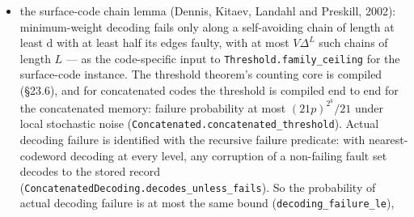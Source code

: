 \documentclass[
]{article}
\providecommand{\tightlist}{%
  \setlength{\itemsep}{0pt}\setlength{\parskip}{0pt}}
\begin{document}
\begin{itemize}
\tightlist
\item
  the surface-code chain lemma (Dennis, Kitaev, Landahl and Preskill,
  2002): minimum-weight decoding fails only along a self-avoiding chain
  of length at least d with at least half its edges faulty, with at most
  \(V\Delta^L\) such chains of length \(L\) --- as the code-specific
  input to
  \texttt{T\allowbreak{}h\allowbreak{}r\allowbreak{}e\allowbreak{}s\allowbreak{}h\allowbreak{}o\allowbreak{}l\allowbreak{}d\allowbreak{}.\allowbreak{}f\allowbreak{}a\allowbreak{}m\allowbreak{}i\allowbreak{}l\allowbreak{}y\allowbreak{}\_\allowbreak{}c\allowbreak{}e\allowbreak{}i\allowbreak{}l\allowbreak{}i\allowbreak{}n\allowbreak{}g}
  for the surface-code instance. The threshold theorem's counting core
  is compiled (§23.6), and for concatenated codes the threshold is
  compiled end to end for the concatenated memory: failure probability
  at most \((21p)^{2^k}/21\) under local stochastic noise
  (\texttt{C\allowbreak{}o\allowbreak{}n\allowbreak{}c\allowbreak{}a\allowbreak{}t\allowbreak{}e\allowbreak{}n\allowbreak{}a\allowbreak{}t\allowbreak{}e\allowbreak{}d\allowbreak{}.\allowbreak{}c\allowbreak{}o\allowbreak{}n\allowbreak{}c\allowbreak{}a\allowbreak{}t\allowbreak{}e\allowbreak{}n\allowbreak{}a\allowbreak{}t\allowbreak{}e\allowbreak{}d\allowbreak{}\_\allowbreak{}t\allowbreak{}h\allowbreak{}r\allowbreak{}e\allowbreak{}s\allowbreak{}h\allowbreak{}o\allowbreak{}l\allowbreak{}d}).
  Actual decoding failure is identified with the recursive failure
  predicate: with nearest-codeword decoding at every level, any
  corruption of a non-failing fault set decodes to the stored record
  (\texttt{C\allowbreak{}o\allowbreak{}n\allowbreak{}c\allowbreak{}a\allowbreak{}t\allowbreak{}e\allowbreak{}n\allowbreak{}a\allowbreak{}t\allowbreak{}e\allowbreak{}d\allowbreak{}D\allowbreak{}e\allowbreak{}c\allowbreak{}o\allowbreak{}d\allowbreak{}i\allowbreak{}n\allowbreak{}g\allowbreak{}.\allowbreak{}d\allowbreak{}e\allowbreak{}c\allowbreak{}o\allowbreak{}d\allowbreak{}e\allowbreak{}s\allowbreak{}\_\allowbreak{}u\allowbreak{}n\allowbreak{}l\allowbreak{}e\allowbreak{}s\allowbreak{}s\allowbreak{}\_\allowbreak{}f\allowbreak{}a\allowbreak{}i\allowbreak{}l\allowbreak{}s}).
  So the probability of actual decoding failure is at most the same
  bound
  (\texttt{d\allowbreak{}e\allowbreak{}c\allowbreak{}o\allowbreak{}d\allowbreak{}i\allowbreak{}n\allowbreak{}g\allowbreak{}\_\allowbreak{}f\allowbreak{}a\allowbreak{}i\allowbreak{}l\allowbreak{}u\allowbreak{}r\allowbreak{}e\allowbreak{}\_\allowbreak{}l\allowbreak{}e}),

\end{itemize}
\end{document}
